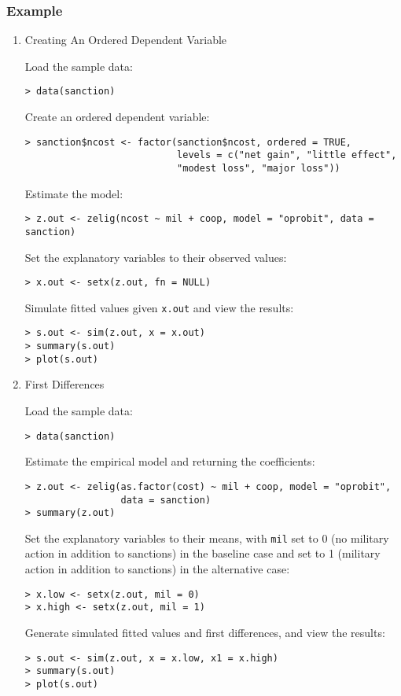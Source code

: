 \subsubsection{Example}
\begin{enumerate}
\item {Creating An Ordered Dependent Variable} \label{ord.fact.p}

Load the sample data:  
\begin{verbatim}
> data(sanction)
\end{verbatim}
Create an ordered dependent variable: 
\begin{verbatim}
> sanction$ncost <- factor(sanction$ncost, ordered = TRUE,
                           levels = c("net gain", "little effect", 
                           "modest loss", "major loss"))
\end{verbatim}
Estimate the model:
\begin{verbatim}
> z.out <- zelig(ncost ~ mil + coop, model = "oprobit", data = sanction)
\end{verbatim}
Set the explanatory variables to their observed values:  
\begin{verbatim}
> x.out <- setx(z.out, fn = NULL)
\end{verbatim}
Simulate fitted values given {\tt x.out} and view the results:
\begin{verbatim}
> s.out <- sim(z.out, x = x.out)
> summary(s.out)
> plot(s.out)
\end{verbatim}

\item {First Differences}

Load the sample data: 
\begin{verbatim}
> data(sanction)
\end{verbatim}
Estimate the empirical model and returning the coefficients:
\begin{verbatim}
> z.out <- zelig(as.factor(cost) ~ mil + coop, model = "oprobit", 
                 data = sanction)
> summary(z.out)
\end{verbatim}
Set the explanatory variables to their means, with {\tt mil} set
to 0 (no military action in addition to sanctions) in the baseline
case and set to 1 (military action in addition to sanctions) in the
alternative case:
\begin{verbatim}
> x.low <- setx(z.out, mil = 0)
> x.high <- setx(z.out, mil = 1)
\end{verbatim}
Generate simulated fitted values and first differences, and view the results:
\begin{verbatim}
> s.out <- sim(z.out, x = x.low, x1 = x.high)
> summary(s.out)
> plot(s.out)
\end{verbatim}
\end{enumerate}

